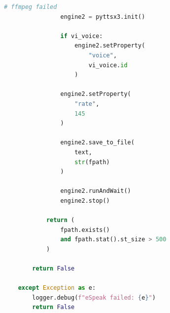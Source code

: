 \begin{lstlisting}[language=Python, caption={Text-to-Speech Audio Generation Functions}, label={lst:tts_functions}]
                # ffmpeg failed
                engine2 = pyttsx3.init()

                if vi_voice:
                    engine2.setProperty(
                        "voice",
                        vi_voice.id
                    )

                engine2.setProperty(
                    "rate",
                    145
                )

                engine2.save_to_file(
                    text,
                    str(fpath)
                )

                engine2.runAndWait()
                engine2.stop()

            return (
                fpath.exists()
                and fpath.stat().st_size > 500
            )

        return False

    except Exception as e:
        logger.debug(f"eSpeak failed: {e}")
        return False
\end{lstlisting}